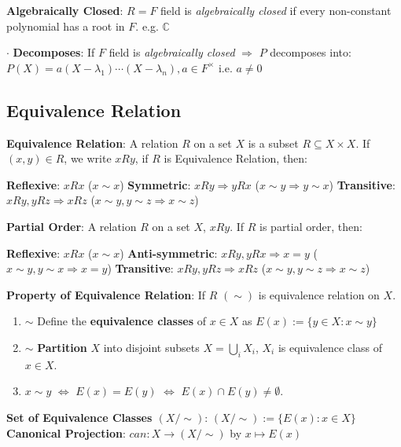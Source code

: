 \documentclass[9pt]{article}
\begin{document}
\textbf{Algebraically Closed}: $R=F$ field is \textit{algebraically closed} if every non-constant polynomial has a root in $F$. \qquad \qquad e.g. $\mathbb{C}$

$\cdot$ \textbf{Decomposes}: If $F$ field is \textit{algebraically closed} $\Rightarrow$ $P$ decomposes into: $P(X)=a(X-\lambda_1)\cdots(X-\lambda_n),a\in F^\times$ {\scriptsize i.e. $a\ne0$}


\subsection{Equivalence Relation}

\textbf{Equivalence Relation}: A relation $R$ on a set $X$ is a subset $R\subseteq X\times X$. If $(x,y)\in R$, we write $xRy$, {\footnotesize if $R$ is Equivalence Relation, then:}

\quad \textbf{Reflexive}: $xRx$ {\scriptsize ($x\sim x$)} \quad \textbf{Symmetric}: $xRy\Rightarrow y Rx$ {\scriptsize ($x\sim y \Rightarrow y\sim x$)} \quad \textbf{Transitive}: $xRy,yRz\Rightarrow xRz$ {\scriptsize ($x\sim y,y\sim z\Rightarrow x\sim z$)}

\textbf{Partial Order}: A relation $R$ on a set $X$, $xRy$. {\footnotesize If $R$ is partial order, then:}

\quad \textbf{Reflexive}: $xRx$ {\scriptsize ($x\sim x$)} \quad \textbf{Anti-symmetric}: $xRy,yRx\Rightarrow x = y$ {\scriptsize ($x\sim y,y\sim x\Rightarrow x=y$)} \quad \textbf{Transitive}: $xRy,yRz\Rightarrow xRz$ {\scriptsize ($x\sim y,y\sim z\Rightarrow x\sim z$)}

\newpage

\textbf{Property of Equivalence Relation}: If $R$ $(\sim)$ is equivalence relation on $X$.

\begin{enumerate}[itemsep=-2pt, topsep=-2pt]
    \item $\sim$ Define the \textbf{equivalence classes} of $x\in X$ as $E(x):=\{y\in X:x\sim y\}$
    \item $\sim$ \textbf{Partition} $X$ into disjoint subsets $X=\bigcup_{i}X_i$, $X_i$ is equivalence class of $x\in X$.
    \item $x\sim y$ \quad $\Leftrightarrow$ \quad $E(x)=E(y)$ \quad $\Leftrightarrow$ \quad $E(x)\cap E(y)\ne\emptyset$.
\end{enumerate}

\textbf{Set of Equivalence Classes $(X/\sim)$}: $(X/\sim):=\{E(x):x\in X\}$ \qquad \textbf{Canonical Projection}: $can:X\to (X/\sim)$ by $x\mapsto E(x)$
\end{document}
